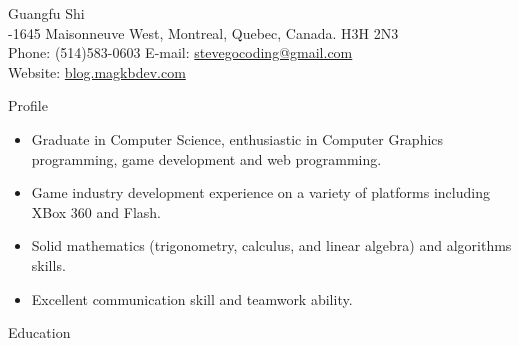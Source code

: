 \documentclass[10pt]{article}
\newenvironment{myitemize}{\begin{itemize} %
        \setlength{\itemsep}{0.25em} 
        \setlength{\topsep}{\itemsep} 
        \setlength{\labelsep}{1em}
        \setlength{\parskip}{0em}
        \setlength{\partopsep}{0em}
}%
{ \end{itemize} }
\begin{document}
 
\date{}
\newlength{\oldcvlabelwidth}
\newlength{\oldcvlabelsep}



\begin{cv} {{\large Guangfu Shi}\\
    { \normalsize {}-1645 Maisonneuve West, Montreal, Quebec, Canada. H3H 2N3 \\ 
    Phone: {\mdseries (514)583-0603}  
    \hfill E-mail: {\mdseries \href{mailto:stevegocoding@gmail.com} {stevegocoding@gmail.com}} \\
	Website: \url{blog.magkbdev.com}
    }
}


\setlength{\oldcvlabelwidth}{\cvlabelwidth}
\setlength{\oldcvlabelsep}{\cvlabelsep}
\setlength{\cvlabelwidth}{0.5em}

%

\begin{cvlist}{Profile} 
\item
    \begin{myitemize}
        	\item Graduate in Computer Science, enthusiastic in Computer Graphics programming, game development and web programming.
        	\item Game industry development experience on a variety of platforms including XBox 360 and Flash.
        	\item Solid mathematics (trigonometry, calculus, and linear algebra) and algorithms skills. 
        	\item Excellent communication skill and teamwork ability. 
    \end{myitemize}
\end{cvlist}


\setlength{\cvlabelwidth}{1em}

\begin{cvlist}{Education}
    

\end{cvlist}
\end{cv}
\end{document}
